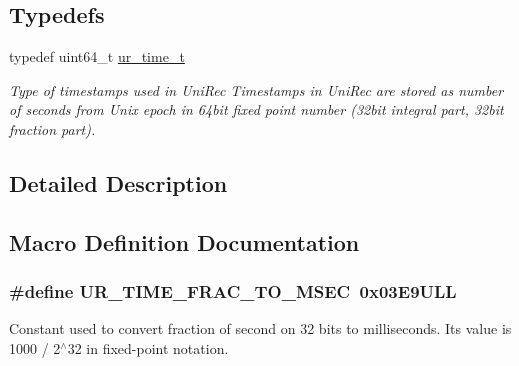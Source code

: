 \subsection*{Typedefs}
\begin{DoxyCompactItemize}
\item 
typedef uint64\+\_\+t \hyperlink{group__ur__time_ga9d13a2ac3696e74a33a93aa0461a3899}{ur\+\_\+time\+\_\+t}\hypertarget{group__ur__time_ga9d13a2ac3696e74a33a93aa0461a3899}{}\label{group__ur__time_ga9d13a2ac3696e74a33a93aa0461a3899}

\begin{DoxyCompactList}\small\item\em Type of timestamps used in Uni\+Rec Timestamps in Uni\+Rec are stored as number of seconds from Unix epoch in 64bit fixed point number (32bit integral part, 32bit fraction part). \end{DoxyCompactList}\end{DoxyCompactItemize}


\subsection{Detailed Description}


\subsection{Macro Definition Documentation}
\subsubsection[{\texorpdfstring{U\+R\+\_\+\+T\+I\+M\+E\+\_\+\+F\+R\+A\+C\+\_\+\+T\+O\+\_\+\+M\+S\+EC}{UR\_TIME\_FRAC\_TO\_MSEC}}]{\setlength{\rightskip}{0pt plus 5cm}\#define U\+R\+\_\+\+T\+I\+M\+E\+\_\+\+F\+R\+A\+C\+\_\+\+T\+O\+\_\+\+M\+S\+EC~0x03\+E9\+U\+LL}\hypertarget{group__ur__time_ga6decebb086670b8be48b9a3e185d1cb7}{}\label{group__ur__time_ga6decebb086670b8be48b9a3e185d1cb7}
Constant used to convert fraction of second on 32 bits to milliseconds. Its value is 1000 / 2$^\wedge$32 in fixed-\/point notation. 
